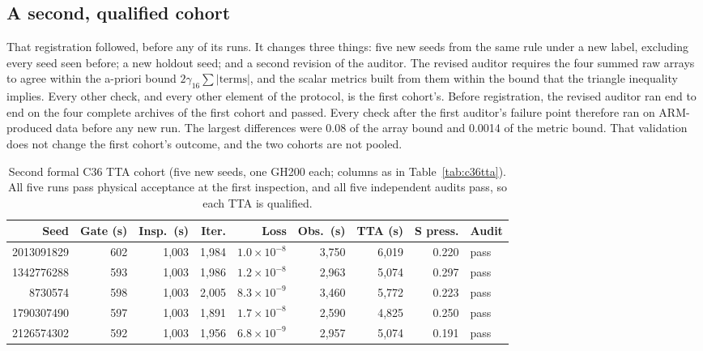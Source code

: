 \documentclass[11pt]{article}
\begin{document}
\subsection{A second, qualified cohort}\label{sec:c36tta2}
That registration followed, before any of its runs. It changes three
things: five new seeds from the same rule under a new label, excluding
every seed seen before; a new holdout seed; and a second revision of the
auditor. The revised auditor requires the four summed raw arrays to agree
within the a-priori bound $2\gamma_{16}\sum|\text{terms}|$, and the scalar
metrics built from them within the bound that the triangle inequality
implies. Every other check, and every other element of the protocol, is
the first cohort's. Before registration, the revised auditor ran end to
end on the four complete archives of the first cohort and passed. Every
check after the first auditor's failure point therefore ran on
ARM-produced data before any new run. The largest differences were 0.08 of
the array bound and 0.0014 of the metric bound. That validation does not
change the first cohort's outcome, and the two cohorts are not pooled.

\begin{table}[htbp]\centering\small
\setlength{\tabcolsep}{4pt}
\caption{Second formal C36 TTA cohort (five new seeds, one GH200 each;
columns as in Table~\ref{tab:c36tta}). All five runs pass physical
acceptance at the first inspection, and all five independent audits pass,
so each TTA is qualified.}
\label{tab:c36tta2}
\begin{tabular}{rrrrrrrrl}\toprule
Seed & Gate (s) & Insp.~(s) & Iter. & Loss & Obs.~(s) & TTA (s) & S press. & Audit\\\midrule
2013091829 & 602 & 1,003 & 1,984 & $1.0\times10^{-8}$ & 3,750 & 6,019 & 0.220 & pass\\
1342776288 & 593 & 1,003 & 1,986 & $1.2\times10^{-8}$ & 2,963 & 5,074 & 0.297 & pass\\
8730574 & 598 & 1,003 & 2,005 & $8.3\times10^{-9}$ & 3,460 & 5,772 & 0.223 & pass\\
1790307490 & 597 & 1,003 & 1,891 & $1.7\times10^{-8}$ & 2,590 & 4,825 & 0.250 & pass\\
2126574302 & 592 & 1,003 & 1,956 & $6.8\times10^{-9}$ & 2,957 & 5,074 & 0.191 & pass
\\\bottomrule\end{tabular}
\end{table}
\end{document}

